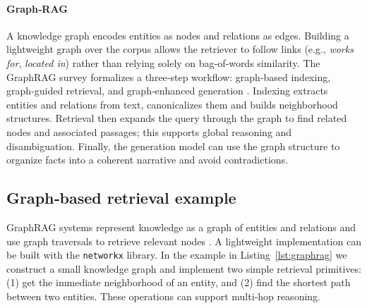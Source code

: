 \paragraph{Graph‑RAG}  A knowledge graph encodes entities as nodes and relations as edges.  Building a lightweight graph over the corpus allows the retriever to follow links (e.g., {\em works for}, {\em located in}) rather than relying solely on bag‑of‑words similarity.  The GraphRAG survey formalizes a three‑step workflow: graph‑based indexing, graph‑guided retrieval, and graph‑enhanced generation \citep{peng2024graphrag_survey}.  Indexing extracts entities and relations from text, canonicalizes them and builds neighborhood structures.  Retrieval then expands the query through the graph to find related nodes and associated passages; this supports global reasoning and disambiguation.  Finally, the generation model can use the graph structure to organize facts into a coherent narrative and avoid contradictions.


\subsection{Graph‑based retrieval example}

GraphRAG systems represent knowledge as a graph of entities and relations and use graph traversals to retrieve relevant nodes \citep{peng2024graphrag_survey}.  A lightweight implementation can be built with the \texttt{networkx} library.  In the example in Listing~\ref{lst:graphrag} we construct a small knowledge graph and implement two simple retrieval primitives: (1) get the immediate neighborhood of an entity, and (2) find the shortest path between two entities.  These operations can support multi‑hop reasoning.

